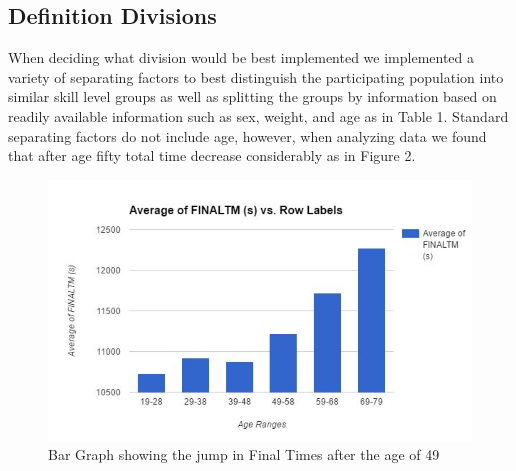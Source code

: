 \documentclass[12pt]{article}
\begin{document}
\subsection{Definition Divisions}
When deciding what division would be best implemented we implemented a variety of separating factors to best distinguish the participating population into similar skill level groups as well as splitting the groups by information based on readily available information such as sex, weight, and age as in Table 1.  Standard separating factors do not include age, however, when analyzing data we found that after age fifty total time decrease considerably as in Figure 2.
\begin{figure}[H]
    \label{fig:Why50}
  \centering
  \includegraphics[width=1\textwidth]{Why50.JPG}
  \caption{Bar Graph showing the jump in Final Times after the age of 49}
\end{figure}
\end{document}
